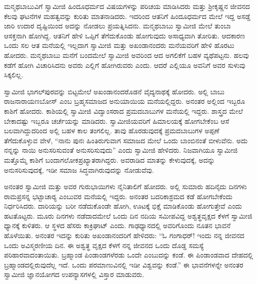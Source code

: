 \vskip 2pt

ಮನ್ಮಥಬಾಬುವಿಗೆ ಸ್ವಾಮೀಜಿ ಹಿಂದೂಧರ್ಮದ ವಿಷಯಗಳನ್ನು ಪರಿಚಯ ಮಾಡಿಸಿದರು ಮತ್ತು ಶ‍್ರೀಕೃಷ್ಣನ ಜೀವನದ ಕೆಲವು ಘಟನೆಗಳ ಮಹತ್ವವನ್ನು ಕುರಿತು ಮಾತನಾಡಿದರು. ಇದರಿಂದ ಆತನಿಗೆ ಹಿಂದೂಧರ್ಮದ ಮೇಲೆ ಇದ್ದ ಅಸಡ್ಡೆ ಜಾರಿ ಉದಾರ ದೃಷ್ಟಿಯಿಂದ ಅದನ್ನು ನೋಡಲು ಪ್ರಯತ್ನಿಸಿದನು. ಮನ್ಮಥಬಾಬು ಸ್ವಾಮೀಜಿ ಮೇಲೆ ತುಂಬಾ ಆಸಕ್ತನಾಗಿ ಹೋಗಿದ್ದ. ಆತನಿಗೆ ಹೇಳಿ ಒಪ್ಪಿಗೆ ತೆಗೆದುಕೊಂಡು ಹೋಗುವುದು ಅಸಾಧ್ಯವಾಗಿ ತೋರಿತು. ಆದಕಾರಣ ಒಂದು ಸಲ ಆತ ಮನೆಯಲ್ಲಿ ಇಲ್ಲದಾಗ ಸ್ವಾಮೀಜಿ ಮತ್ತು ಅಖಂಡಾನಂದರು ಮನೆಯವರಿಗೆ ಹೇಳಿ ಹೊರಟು ಹೋದರು. ಮನ್ಮಥಬಾಬು ಮನೆಗೆ ಬಂದಮೇಲೆ ಸ್ವಾಮೀಜಿ ಅವರಿಂದ ಆದ ಅಗಲಿಕೆಗೆ ಬಹಳ ವ್ಯಥೆಪಟ್ಟನು. ಹಲವು ಕಡೆಗೆ ಹೋಗಿ ವಿಚಾರಿಸಿದನು ಅವರು ಎಲ್ಲಿಗೆ ಹೋಗಿರುವರು ಎಂದು. ಆದರೆ ಎಲ್ಲಿಯೂ ಅವನಿಗೆ ಅವರ ಸುಳುವು ಸಿಕ್ಕಲಿಲ್ಲ. 

\vskip 2pt

 ಸ್ವಾಮೀಜಿ ಭಾಗಲ್‍ಪುರವನ್ನು ಬಿಟ್ಟಮೇಲೆ ಅಖಂಡಾನಂದರೊಡನೆ ವೈದ್ಯನಾಥಕ್ಕೆ ಹೋದರು. ಅಲ್ಲಿ ಬಾಬು ರಾಜನಾರಾಯಣಬೋಸ್ ಎಂಬ ಬ್ರಹ್ಮಸಮಾಜದ ಅನುಯಾಯಿಯ ಮನೆಯಲ್ಲಿದ್ದರು. ಅನಂತರ ಅಲ್ಲಿಂದ ಇಬ್ಬರೂ ಕಾಶಿಗೆ ಹೋದರು. ಕಾಶಿಯಲ್ಲಿ ಸ್ವಾಮೀಜಿ ವಿದ್ವಾಂಸರಾದ ಪ್ರಮದಬಾಬುಗಳ ಮನೆಯಲ್ಲಿ ಇದ್ದರು. ಶಾಸ್ತ್ರದ ಮೇಲೆ ಬೇಕಾದಷ್ಟು ಇಬ್ಬರೂ ಚರ್ಚೆಯನ್ನು ಮಾಡಿದರು. ಸ್ವಾಮೀಜಿಯವರಿಗೆ ಹಿಮಾಲಯಕ್ಕೆ ಹೋಗಬೇಕೆಂಬ ಆಸೆ ಬಲವಾಗಿದ್ದುದರಿಂದ ಅಲ್ಲಿ ಬಹಳ ಕಾಲ ತಂಗಲಿಲ್ಲ. ತಾವು ಹೊರಡುವುದಕ್ಕೆ ಪ್ರಮದಬಾಬುಗಳ ಅಪ್ಪಣೆ ತೆಗೆದುಕೊಳ್ಳುವ ವೇಳೆ, “ನಾನು ಪುನಃ ಹಿಂತಿರುಗುವಾಗ ಸಮಾಜದ ಮೇಲೆ ಒಂದು ಬಾಂಬಿನಂತೆ ಬೀಳುವೆನು. ಅದು ನನ್ನನ್ನು ನಾಯಿ ಅನುಸರಿಸುವಂತೆ ಅನುಸರಿಸುವುದು” ಎಂದು ಸ್ವಾಮೀಜಿ ಹೇಳಿದರು. ನಿಜವಾಗಿಯೂ ಸ್ವಾಮೀಜಿ ಮತ್ತೊಮ್ಮೆ ಕಾಶಿಗೆ ಬಂದಾಗ\break ಲೋಕಪ್ರಖ್ಯಾತರಾಗಿದ್ದರು. ಅವರಾಡಿದ ಮಾತನ್ನು ಕೇಳುವುದಕ್ಕೆ, ಅದನ್ನು ಅನುಸರಿಸುವುದಕ್ಕೆ, ಇಡೀ ಸಮಾಜ ಸಿದ್ಧವಾಗಿರುವುದನ್ನು ನೋಡುವೆವು. 

ಅನಂತರ ಸ್ವಾಮೀಜಿ ಮತ್ತು ಅವರ ಗುರುಭಾಯಿಗಳು ನೈನಿತಾಲಿಗೆ ಹೋದರು. ಅಲ್ಲಿ ಸುಮಾರು ಹದಿನೈದು ದಿನಗಳು ರಾಮಪ್ರಸನ್ನ ಭಟ್ಟಾಚಾರ‍್ಯ ಎಂಬುವರ ಮನೆಯಲ್ಲಿ ಇದ್ದರು. ಅನಂತರ ಬದರಿಕಾಶ್ರಮದ ಕಡೆ ಹೋಗಬೇಕೆಂದು ನಿರ್ಧರಿಸಿದರು. ದಾರಿಯನ್ನು ಬರೀ ನಡೆದುಕೊಂಡೇ ಹೋಗಿ, ಊಟಕ್ಕೆ ಭಿಕ್ಷೆ ಮಾಡಿಕೊಂಡು ಹೋಗುತ್ತೇವೆ ಎಂದು ಹಟತೊಟ್ಟರು. ಮೂರು ದಿನಗಳು ನಡೆದಾದಮೇಲೆ ಒಂದು ದಿನ ನದಿಯ ಸಮೀಪವಿದ್ದ ಅಶ್ವತ್ಥವೃಕ್ಷದ ಕೆಳಗೆ ಸ್ವಾಮೀಜಿ ಧ್ಯಾನಕ್ಕೆ ಕುಳಿತರು. ಆ ಸ್ಥಳದ ಹೆಸರು ಕಾಕ್ರಿಘಾಟ್ ಎಂದು. ಗಾಢಧ್ಯಾನದಲ್ಲಿ ಅವರಿಗೊಂದು ನೂತನ ಭಾವನೆ ಹೊಳೆಯಿತು. ಅನಂತರ ಇದನ್ನು ಕುರಿತು ಅಖಂಡಾನಂದರಿಗೆ ಹೇಳಿದರು: “ಓ ಗಂಗಾಧರ್! ಇಂದು ನನ್ನ ಜೀವನದ ಒಂದು ಅವಿಸ್ಮರಣೀಯ ದಿನ. ಈ ಅಶ್ವತ್ಥ ವೃಕ್ಷದ ಕೆಳಗೆ ನನ್ನ ಜೀವನದ ಒಂದು ದೊಡ್ಡ ಸಮಸ್ಯೆ ಪರಿಹಾರವಾದಂತಾಯಿತು. ಬ್ರಹ್ಮಾಂಡ ಪಿಂಡಾಂಡಗಳೆರಡು ಒಂದೇ ಎಂಬುದನ್ನು ಕಂಡೆ. ಈ ಪಿಂಡಾಂಡವಾದ ದೇಹದಲ್ಲಿ ಬ್ರಹ್ಮಾಂಡದಲ್ಲಿರುವುದೆಲ್ಲ ಇದೆ. ಒಂದು ಪರಮಾಣುವಿನಲ್ಲಿ ಇಡೀ ವಿಶ್ವವನ್ನು ಕಂಡೆ.” ಈ ಭಾವನೆಗಳನ್ನೇ ಅನಂತರ ಸ್ವಾಮೀಜಿ ಜ್ಞಾನಯೋಗದ ಉಪನ್ಯಾಸಗಳಲ್ಲಿ ವಿಸ್ತಾರ ಮಾಡುವರು. 

